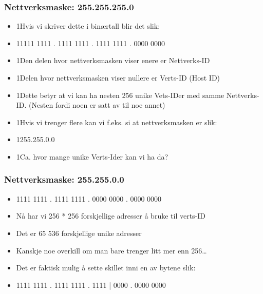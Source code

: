 \documentclass[aspectratio=169,xcolor=dvipsnames]{beamer}
\begin{document}
\begin{frame}
	\frametitle{Nettverksmaske: 255.255.255.0}

			\begin{itemize}

				\item 1Hvis vi skriver dette i binærtall blir det slik:
				\item 11111 1111 . 1111 1111 . 1111 1111 . 0000 0000
				\item 1Den delen hvor nettverksmasken viser enere er Nettverks-ID
				\item 1Delen hvor nettverksmasken viser nullere er Verts-ID (Host ID)
				\item 1Dette betyr at vi kan ha nesten 256 unike Vets-IDer med samme Nettverks-ID. (Nesten fordi noen er satt av til noe annet)
				\item 1Hvis vi trenger flere kan vi f.eks. si at nettverksmasken er slik:
				\item 1255.255.0.0
				\item 1Ca. hvor mange unike Verts-Ider kan vi ha da?

			\end{itemize}
\end{frame}
\begin{frame}
	\frametitle{Nettverksmaske: 255.255.0.0}

			\begin{itemize}
				\item 1111 1111 . 1111 1111 . 0000 0000 . 0000 0000
				\item Nå har vi 256 * 256 forskjellige adresser å bruke til verts-ID
				\item Det er 65 536 forskjellige unike adresser
				\item Kanskje noe overkill om man bare trenger litt mer enn 256…
				\item Det er faktisk mulig å sette skillet inni en av bytene slik:
				\item 1111 1111 . 1111 1111 . 1111 | 0000 . 0000 0000	
					
			\end{itemize}
\end{frame}
\end{document}
